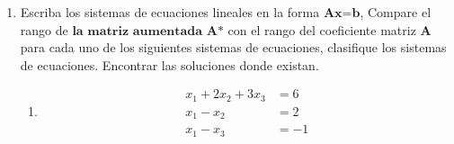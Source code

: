 \documentclass[12pt,a4paper]{report}
\begin{document}
\begin{enumerate}
\begin{enumerate}
\item $x^{t}y$
\begin{verbatim}
> t(x) %*%y
     [,1]
[1,]   15
\end{verbatim}
\item $xx^{t}$
\begin{verbatim}
> x%*%t(x)
     [,1] [,2] [,3]
[1,]    9   -3    6
[2,]   -3    1   -2
[3,]    6   -2    4
\end{verbatim}
\item $xy^{t}$
\begin{verbatim}
> x%*%t(y)
     [,1] [,2] [,3]
[1,]    9    6   12
[2,]   -3   -2   -4
[3,]    6    4    8
\end{verbatim}
\item $B^{t}B$
\begin{verbatim}
> t(B) %*%B 
     [,1] [,2] [,3]
[1,]   89  -11   28
[2,]  -11   14  -21
[3,]   28  -21   34
\end{verbatim}
\item $yz^{t}$
\begin{verbatim}
> y%*%t(z)
     [,1] [,2]
[1,]    6   15
[2,]    4   10
[3,]    8   20
\end{verbatim}
\item $\sqrt{y^{t}y}$
\begin{verbatim}
> sqrt(t(y) %*%y)
         [,1]
[1,] 5.385165
\end{verbatim}
\item $B^{t}B$
\begin{verbatim}
> t(B) %*%B 
     [,1] [,2] [,3]
[1,]   89  -11   28
[2,]  -11   14  -21
[3,]   28  -21   34
\end{verbatim}
\item Encuentre $x+y$ y $x-y$
\begin{verbatim}
> x+y
     [,1]
[1,]    6
[2,]    1
[3,]    6
> x-y
     [,1]
[1,]    0
[2,]   -3
[3,]   -2
\end{verbatim}
\end{enumerate}
\item Escriba los sistemas de ecuaciones lineales en la forma $\textbf{Ax=b}$, Compare el rango de $\textbf{la matriz aumentada A*}$ con el rango del coeficiente matriz $\textbf{A}$ para cada uno de los
siguientes sistemas de ecuaciones, clasifique los sistemas de ecuaciones. Encontrar las soluciones donde existan.\\

\begin{enumerate}
\item 
\begin{align*}
x_{1}+2x_{2}+3x_{3}&=6\\
x_{1}-x_{2}&=2\\
x_{1}-x_{3}&=-1
\end{align*}


\end{enumerate}
\end{enumerate}
\end{document}
